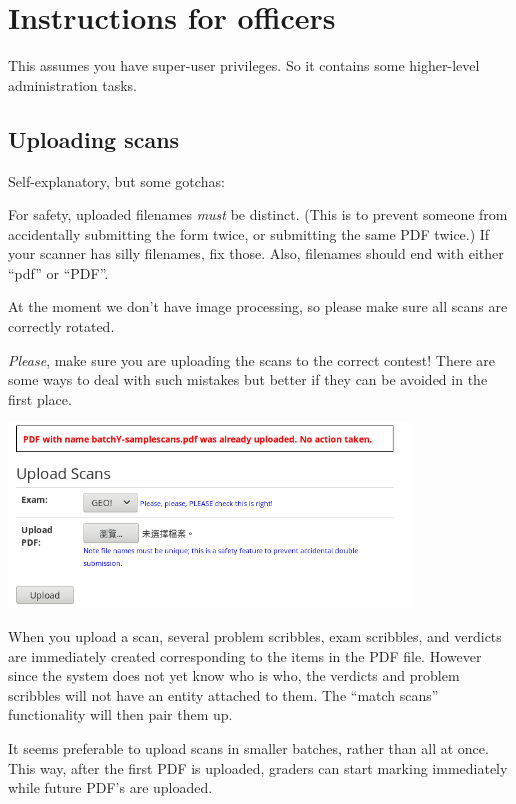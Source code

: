 \chapter{Instructions for officers}
This assumes you have super-user privileges.
So it contains some higher-level administration tasks.

\section{Uploading scans}
Self-explanatory, but some gotchas:
\begin{itemize}
	\ii For safety, uploaded filenames \emph{must} be distinct.
	(This is to prevent someone from accidentally submitting the form twice,
	or submitting the same PDF twice.)
	If your scanner has silly filenames, fix those.
	Also, filenames should end with either ``pdf'' or ``PDF''.

	\ii At the moment we don't have image processing,
	so please make sure all scans are correctly rotated.

	\ii \emph{Please}, make sure you are uploading the scans
	to the correct contest!
	There are some ways to deal with such mistakes but better
	if they can be avoided in the first place.
\end{itemize}

\begin{center}
	\includegraphics[width=0.8\textwidth]{images/batchscan.png}
\end{center}

When you upload a scan,
several problem scribbles, exam scribbles, and verdicts
are immediately created corresponding to the items in the PDF file.
However since the system does not yet know who is who,
the verdicts and problem scribbles will not have an entity attached to them.
The ``match scans'' functionality will then pair them up.

It seems preferable to upload scans in smaller batches,
rather than all at once.
This way, after the first PDF is uploaded,
graders can start marking immediately
while future PDF's are uploaded.

